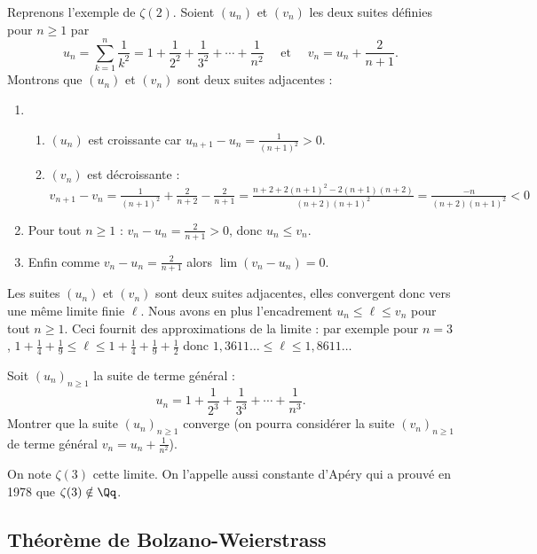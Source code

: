 \documentclass[class=report,crop=false]{standalone}
\begin{document}
\begin{exemple}
Reprenons l'exemple de $\zeta(2)$. Soient $(u_n)$ et $(v_n)$ les deux suites définies pour $n \ge 1$ par
$$u_n = \sum_{k=1}^n \frac 1 {k^2} = 1+\frac{1}{2^2} +\frac{1}{3^2}+\cdots+\frac{1}{n^2} \quad \text{ et } \quad v_n = u_n + \frac2{n+1} .$$
Montrons que $(u_n)$ et $(v_n)$ sont deux suites adjacentes :
\begin{enumerate}
  \item
  \begin{enumerate}
    \item $(u_n)$ est croissante car $u_{n+1}-u_n = \frac{1}{(n+1)^2} > 0$.
    \item $(v_n)$ est décroissante : \\
    $v_{n+1}-v_n = \frac{1}{(n+1)^2} + \frac{2}{n+2} - \frac{2}{n+1}
    = \frac{n+2+2(n+1)^2-2(n+1)(n+2)}{(n+2)(n+1)^2} = \frac{-n}{(n+2)(n+1)^2}< 0$
  \end{enumerate}

  \item Pour tout $n\ge 1$ : $v_n-u_n = \frac{2}{n+1} >0$, donc $u_n \le v_n$.

  \item Enfin comme $v_n-u_n = \frac{2}{n+1}$ alors $\lim (v_n-u_n) = 0$.
\end{enumerate}

Les suites $(u_n)$ et $(v_n)$ sont deux suites adjacentes, elles convergent donc vers une même limite
finie $\ell$. Nous avons en plus l'encadrement $u_n \le \ell \le v_n$ pour tout $n\ge 1$.
Ceci fournit des approximations de la limite :
par exemple pour $n=3$, $1+\frac{1}{4} +\frac{1}{9} \le \ell \le 1+\frac{1}{4} +\frac{1}{9} + \frac{1}{2}$
donc $1,3611\ldots \le \ell \le 1,8611\ldots$
\end{exemple}


\begin{exercicecours}
  Soit $(u_n)_{n\geq 1}$ la suite de terme général :
\[ u_n =1+\frac{1}{2^3} +\frac{1}{3^3}+\cdots+\frac{1}{n^3} .\]
Montrer que la suite $(u_n)_{n\geq 1}$ converge (on pourra considérer la suite
$(v_n)_{n\geq 1}$ de terme général $v_n=u_n+  \frac{1}{n^2}$).
\end{exercicecours}

\begin{remarque*}
  On note $\zeta(3)$ cette limite. On l'appelle aussi constante d'Apéry qui a prouvé en 1978 que $\zeta(3)\notin \Qq$.
\end{remarque*}

\subsection{Théorème de Bolzano-Weierstrass}
\end{document}
